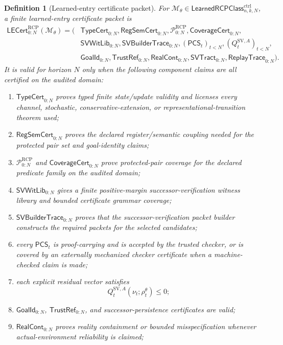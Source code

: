 \documentclass[11pt]{article}
\newtheorem{definition}[theorem]{Definition}
\newcommand{\Pcal}{\mathcal{P}}
\newcommand{\1}{\mathbf{1}}
\newcommand{\RCP}{\mathrm{RCP}}
\begin{document}
\begin{definition}[Learned-entry certificate packet]
\label{def:m3_min_learned_entry_certificate}
For \(\mathcal M_\theta\in\mathsf{LearnedRCPClass}_{n,k,N}^{\mathrm{ctrl}}\), a finite learned-entry certificate packet is
\[
\begin{aligned}
\mathsf{LECert}_{0:N}^{\RCP}(\mathcal M_\theta)=(&
\mathsf{TypeCert}_{0:N},
\mathsf{RegSemCert}_{0:N},
\Pcal_{0:N}^{\RCP},
\mathsf{CoverageCert}_{0:N},\\
&\mathsf{SVWitLib}_{0:N},
\mathsf{SVBuilderTrace}_{0:N},
(\mathsf{PCS}_t)_{t<N},
(Q_t^{\mathrm{SV},A})_{t<N},\\
&\mathsf{GoalId}_{0:N},
\mathsf{TrustRef}_{0:N},
\mathsf{RealCont}_{0:N},
\mathsf{SVTract}_{0:N},
\mathsf{ReplayTrace}_{0:N}).
\end{aligned}
\]
It is valid for horizon \(N\) only when the following component claims are all certified on the audited domain:
\begin{enumerate}[label=(\roman*),leftmargin=1.5em]
    \item \(\mathsf{TypeCert}_{0:N}\) proves typed finite state/update validity and licenses every channel, stochastic, conservative-extension, or representational-transition theorem used;
    \item \(\mathsf{RegSemCert}_{0:N}\) proves the declared register/semantic coupling needed for the protected pair set and goal-identity claims;
    \item \(\Pcal_{0:N}^{\RCP}\) and \(\mathsf{CoverageCert}_{0:N}\) prove protected-pair coverage for the declared predicate family on the audited domain;
    \item \(\mathsf{SVWitLib}_{0:N}\) gives a finite positive-margin successor-verification witness library and bounded certificate grammar coverage;
    \item \(\mathsf{SVBuilderTrace}_{0:N}\) proves that the successor-verification packet builder constructs the required packets for the selected candidates;
    \item every \(\mathsf{PCS}_t\) is proof-carrying and is accepted by the trusted checker, or is covered by an externally mechanized checker certificate when a machine-checked claim is made;
    \item each explicit residual vector satisfies
    \[
    Q_t^{\mathrm{SV},A}(\nu_t;\rho_t^\theta)\le0;
    \]
    \item \(\mathsf{GoalId}_{0:N}\), \(\mathsf{TrustRef}_{0:N}\), and successor-persistence certificates are valid;
    \item \(\mathsf{RealCont}_{0:N}\) proves reality containment or bounded misspecification whenever actual-environment reliability is claimed;

\end{enumerate}
\end{definition}
\end{document}
